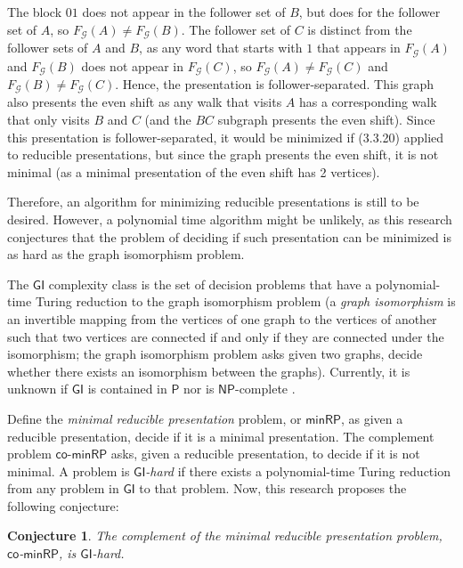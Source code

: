 \documentclass{article}
\newcommand{\Gc}{\mathcal{G}}  %
\newcommand{\term}[1]{\textit{#1}}
\newcommand{\co}{\mathsf{co}}
\newcommand{\GI}{\mathsf{GI}}
\newtheorem*{conjecture}{Conjecture}
\begin{document}
The block \(01\) does not appear in the follower set of \(B\), but does for the follower 
set of \(A\), so \(F_\Gc(A) \ne F_\Gc(B)\). The follower set of \(C\) is distinct from
the follower sets of \(A\) and \(B\), as any word that starts with \(1\) that appears in 
\(F_\Gc(A)\) and \(F_\Gc(B)\) does not appear in \(F_\Gc(C)\), so \(F_\Gc(A) \ne F_\Gc(C)\) and 
\(F_\Gc(B) \ne F_\Gc(C)\). Hence, the presentation is follower-separated. This graph also presents 
the even shift as any walk that visits \(A\) has a corresponding walk that only visits \(B\) 
and \(C\) (and the \(BC\) subgraph presents the even shift). Since this presentation is 
follower-separated, it would be minimized if (3.3.20) applied to reducible presentations, 
but since the graph presents the even shift, it is not minimal (as a minimal 
presentation of the even shift has 2 vertices).

Therefore, an algorithm for minimizing reducible presentations is still to be desired. However, 
a polynomial time algorithm might be unlikely, as this research conjectures that the problem 
of deciding if such presentation can be minimized is as hard as the graph isomorphism problem. 

The \(\GI\) complexity class is the set of decision 
problems that have a polynomial-time Turing reduction to the graph isomorphism problem (a 
\term{graph isomorphism} is an invertible mapping from the vertices of one graph 
to the vertices of another such that two vertices are connected if and only if they 
are connected under the isomorphism; the graph isomorphism problem asks given two 
graphs, decide whether there exists an isomorphism between the graphs).
Currently, it is unknown if \(\GI\) is contained in \(\mathsf{P}\) nor is \(\mathsf{NP}\)-complete \cite{kobler2012graph}.

Define the \term{minimal reducible presentation} problem, or \(\mathsf{minRP}\), as given a reducible presentation,
decide if it is a minimal presentation.
The complement problem \(\co\)-\(\mathsf{minRP}\) asks, given a reducible presentation, to decide if it is not minimal. 
A problem is \term{\(\GI\)-hard} if there exists a polynomial-time Turing reduction from 
any problem in \(\GI\) to that problem. Now, this research proposes the following 
conjecture:

\begin{conjecture}
    The complement of the minimal reducible presentation problem, \(\co\)-\(\mathsf{minRP}\), is \(\GI\)-hard.
\end{conjecture}
\end{document}
